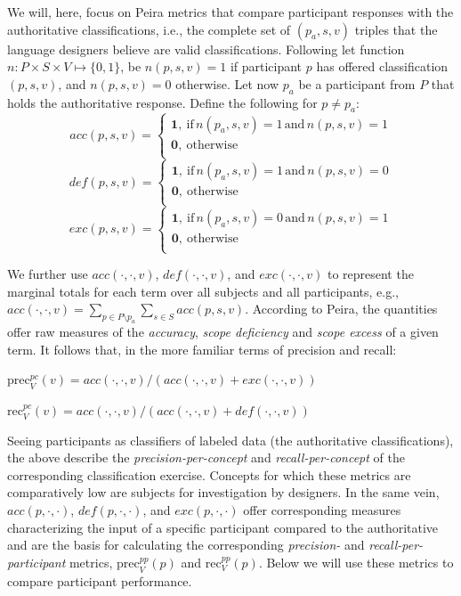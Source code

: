 We will, here, focus on Peira metrics that compare participant responses with the authoritative classifications, i.e., the complete set of $(p_a,s,v)$ triples that the language designers believe are valid classifications. Following \cite{LZMK.24} let function $n: P\times S \times V \mapsto \{0,1\}$, be $n(p,s,v) = 1$ if participant $p$ has offered classification $(p,s,v)$, and $n(p,s,v) = 0$ otherwise. Let now $p_a$ be a participant from $P$ that holds the authoritative response. Define the following for $p\neq p_a$:
\vspace{-1mm}
\[ 
\mathit{acc}(p,s,v)= \left\{
\begin{array}{ll}
	\mathbf{1}, \:\mathrm{if}\,n(p_a,s,v) = 1\,\mathrm{and}\,n(p,s,v) = 1\\
	\textbf{0}, \:\mathrm{otherwise} \\
\end{array} 
\right. 
\]
\[
\mathit{def}(p,s,v)= \left\{
\begin{array}{ll}
	\mathbf{1}, \:\mathrm{if}\,n(p_a,s,v) = 1\,\mathrm{and}\,n(p,s,v) = 0\\
	\textbf{0}, \:\mathrm{otherwise} \\
\end{array} 
\right. 
\]
\[
\mathit{exc}(p,s,v)= \left\{
\begin{array}{ll}
	\mathbf{1}, \:\mathrm{if}\,n(p_a,s,v) = 0\,\mathrm{and}\,n(p,s,v) = 1\\
	\textbf{0}, \:\mathrm{otherwise} \\
\end{array} 
\right. 
\]

We further use $\mathit{acc}(\cdot,\cdot,v)$, $\mathit{def}(\cdot,\cdot,v)$, and 
$\mathit{exc}(\cdot,\cdot,v)$ to represent the marginal totals for each term over all subjects and all participants, e.g., $\mathit{acc}(\cdot,\cdot,v) = \sum_{p\in {P \setminus {p_a}}}\sum_{s\in S} \mathit{acc(p,s,v)}$. According to Peira, the quantities offer raw measures of the {\em accuracy}, {\em scope deficiency} and {\em scope excess} of a given term. It follows that, in the more familiar terms of precision and recall:

\noindent $\mathrm{prec}^{pc}_V(v) = acc(\cdot,\cdot,v)/(acc(\cdot,\cdot,v)+exc(\cdot,\cdot,v))$

\noindent $\mathrm{rec}^{pc}_V(v) = acc(\cdot,\cdot,v)/(acc(\cdot,\cdot,v)+def(\cdot,\cdot,v))$

Seeing participants as classifiers of labeled data (the authoritative classifications), the above describe the \textit{precision-per-concept} and \textit{recall-per-concept} of the corresponding classification exercise. Concepts for which these metrics are comparatively low are subjects for investigation by designers. In the same vein, $\mathit{acc}(p,\cdot,\cdot)$, $\mathit{def}(p,\cdot,\cdot)$, and $\mathit{exc}(p,\cdot,\cdot)$ offer corresponding measures characterizing the input of a specific participant compared to the authoritative and are the basis for calculating the corresponding \textit{precision-} and \textit{recall-per-participant} metrics, $\mathrm{prec}^{pp}_V(p)$ and $\mathrm{rec}^{pp}_V(p)$. Below we will use these metrics to compare participant performance.


